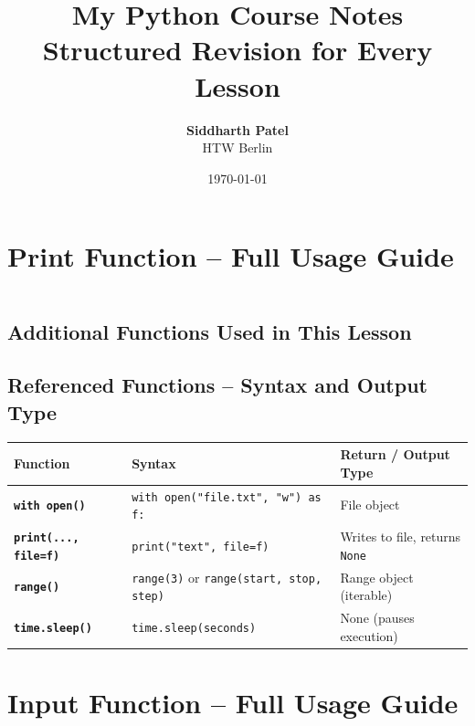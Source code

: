 \documentclass[a4paper,11pt]{article}
\title{\Huge \textbf{My Python Course Notes}\\[1ex]
	\Large Structured Revision for Every Lesson}
\author{\textbf{Siddharth Patel} \\ HTW Berlin}
\date{\today}
\begin{document}
	
	\maketitle
	\thispagestyle{empty}
	\newpage
	\tableofcontents
	\newpage
	
	\section{Print Function – Full Usage Guide}
	\inputminted{python}{Python_Files/print_guid.py}
	
	\vspace{1em}
	\subsection*{Additional Functions Used in This Lesson}
	
\vspace{1em}
\subsection*{Referenced Functions – Syntax and Output Type}

\begin{tabular}{>{\bfseries}p{4cm} p{7.5cm} p{3cm}}
	\toprule
	Function & Syntax & Return / Output Type \\
	\midrule
	
	\texttt{with open()} & \texttt{with open("file.txt", "w") as f:} & File object \\
	\texttt{print(..., file=f)} & \texttt{print("text", file=f)} & Writes to file, returns \texttt{None} \\
	
	\texttt{range()} & \texttt{range(3)} or \texttt{range(start, stop, step)} & Range object (iterable) \\
	
	\texttt{time.sleep()} & \texttt{time.sleep(seconds)} & None (pauses execution) \\
	
	\bottomrule
\end{tabular}

	\newpage
	
	\section{Input Function – Full Usage Guide}
	\inputminted{python}{Python_Files/input_guid.py}
	
\end{document}
